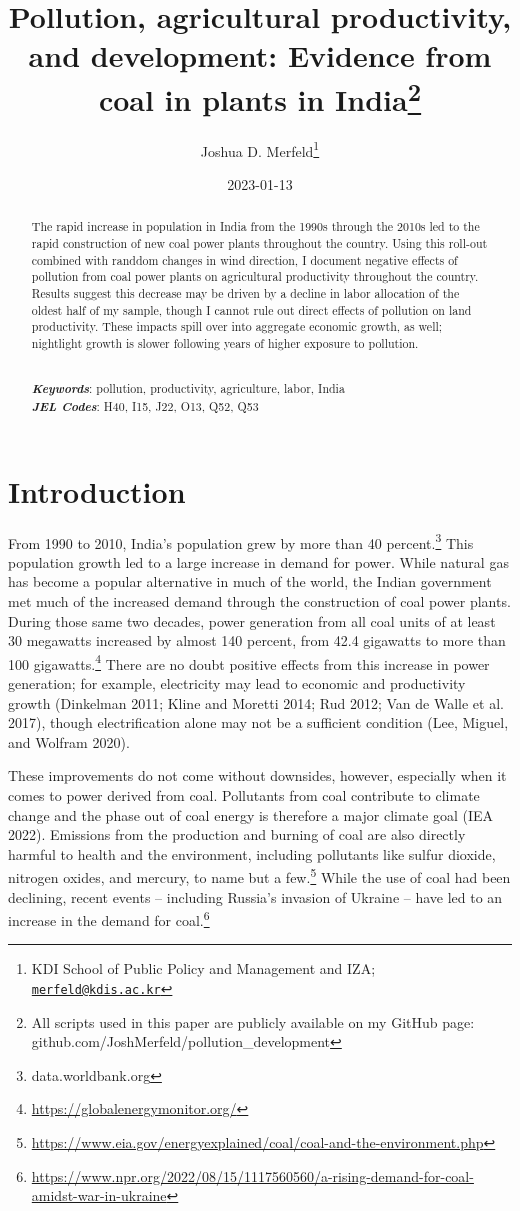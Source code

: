 \documentclass[
]{article}
\title{Pollution, agricultural productivity, and development: Evidence from coal in plants in India\footnote{All scripts used in this paper are publicly available on my GitHub page: github.com/JoshMerfeld/pollution\_development}}
\author{Joshua D. Merfeld\footnote{KDI School of Public Policy and Management and IZA; \href{mailto:merfeld@kdis.ac.kr}{\nolinkurl{merfeld@kdis.ac.kr}}}}
\date{2023-01-13}
\begin{document}
\maketitle
\begin{abstract}
\noindent The rapid increase in population in India from the 1990s through the 2010s led to the rapid construction of new coal power plants throughout the country. Using this roll-out combined with randdom changes in wind direction, I document negative effects of pollution from coal power plants on agricultural productivity throughout the country. Results suggest this decrease may be driven by a decline in labor allocation of the oldest half of my sample, though I cannot rule out direct effects of pollution on land productivity. These impacts spill over into aggregate economic growth, as well; nightlight growth is slower following years of higher exposure to pollution.\\
\strut \\
\textbf{\textit{Keywords}}: pollution, productivity, agriculture, labor, India\\
\textbf{\textit{JEL Codes}}: H40, I15, J22, O13, Q52, Q53
\end{abstract}

\newpage
\doublespacing

\hypertarget{introduction}{%
\section{Introduction}\label{introduction}}

From 1990 to 2010, India's population grew by more than 40 percent.\footnote{data.worldbank.org} This population growth led to a large increase in demand for power. While natural gas has become a popular alternative in much of the world, the Indian government met much of the increased demand through the construction of coal power plants. During those same two decades, power generation from all coal units of at least 30 megawatts increased by almost 140 percent, from 42.4 gigawatts to more than 100 gigawatts.\footnote{\url{https://globalenergymonitor.org/}} There are no doubt positive effects from this increase in power generation; for example, electricity may lead to economic and productivity growth (Dinkelman 2011; Kline and Moretti 2014; Rud 2012; Van de Walle et al. 2017), though electrification alone may not be a sufficient condition (Lee, Miguel, and Wolfram 2020).

These improvements do not come without downsides, however, especially when it comes to power derived from coal. Pollutants from coal contribute to climate change and the phase out of coal energy is therefore a major climate goal (IEA 2022). Emissions from the production and burning of coal are also directly harmful to health and the environment, including pollutants like sulfur dioxide, nitrogen oxides, and mercury, to name but a few.\footnote{\url{https://www.eia.gov/energyexplained/coal/coal-and-the-environment.php}} While the use of coal had been declining, recent events -- including Russia's invasion of Ukraine -- have led to an increase in the demand for coal.\footnote{\url{https://www.npr.org/2022/08/15/1117560560/a-rising-demand-for-coal-amidst-war-in-ukraine}}
\end{document}

